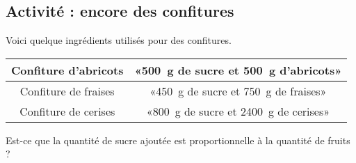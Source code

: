 
\begin{exercice}\label{exo2smath-0122}

\subsection*{Activité : encore des confitures}

Voici quelque ingrédients utilisés pour des confitures.
\begin{center}
    \begin{tabular}[]{|c|c|}
        \hline
        Confiture d'abricots& «\SI{500}{\gram} de sucre et \SI{500}{\gram} d'abricots» \\
        \hline
        Confiture de fraises&«\SI{450}{\gram} de sucre et \SI{750}{\gram} de fraises» \\
        \hline
        Confiture de cerises&  «\SI{800}{\gram} de sucre et \SI{2400}{\gram} de cerises» \\ 
        \hline
    \end{tabular}
\end{center}
Est-ce que la quantité de sucre ajoutée est proportionnelle à la quantité de fruits ?


\end{exercice}
